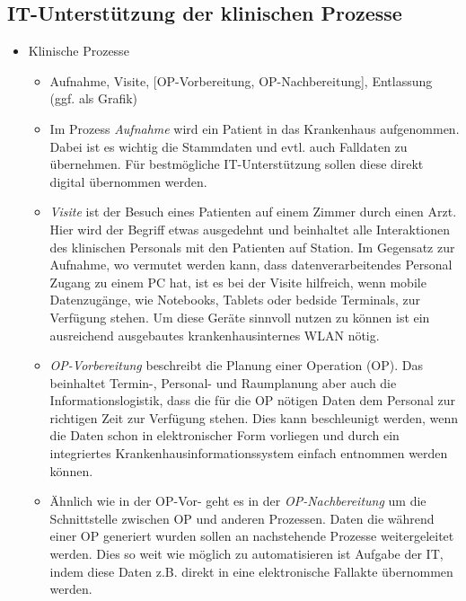 	\subsection{IT-Unterstützung der klinischen Prozesse}
		\begin{itemize}
			\item Klinische Prozesse
			\begin{itemize}
				\item Aufnahme, Visite, [OP-Vorbereitung, OP-Nachbereitung], Entlassung (ggf. als Grafik) \parencite[37]{huebner2019}
				\item Im Prozess \textit{Aufnahme} wird ein Patient in das Krankenhaus aufgenommen. Dabei ist es wichtig die Stammdaten und evtl. auch Falldaten zu übernehmen. Für bestmögliche IT-Unterstützung sollen diese direkt digital übernommen werden. 
				\item \textit{Visite} ist der Besuch eines Patienten auf einem Zimmer durch einen Arzt. Hier wird der Begriff etwas ausgedehnt und beinhaltet alle Interaktionen des klinischen Personals mit den Patienten auf Station. Im Gegensatz zur Aufnahme, wo vermutet werden kann, dass datenverarbeitendes Personal Zugang zu einem PC hat, ist es bei der Visite hilfreich, wenn mobile Datenzugänge, wie Notebooks, Tablets oder bedside Terminals, zur Verfügung stehen. Um diese Geräte sinnvoll nutzen zu können ist ein ausreichend ausgebautes krankenhausinternes WLAN nötig.
				\item \textit{OP-Vorbereitung} beschreibt die Planung einer Operation (OP). Das beinhaltet Termin-, Personal- und Raumplanung aber auch die Informationslogistik, dass die für die OP nötigen Daten dem Personal zur richtigen Zeit zur Verfügung stehen. Dies kann beschleunigt werden, wenn die Daten schon in elektronischer Form vorliegen und durch ein integriertes Krankenhausinformationssystem einfach entnommen werden können.
				\item Ähnlich wie in der OP-Vor- geht es in der \textit{OP-Nachbereitung} um die Schnittstelle zwischen OP und anderen Prozessen. Daten die während einer OP generiert wurden sollen an nachstehende Prozesse weitergeleitet werden. Dies so weit wie möglich zu automatisieren ist Aufgabe der IT, indem diese Daten z.B. direkt in eine elektronische Fallakte übernommen werden.

\end{itemize}
\end{itemize}
